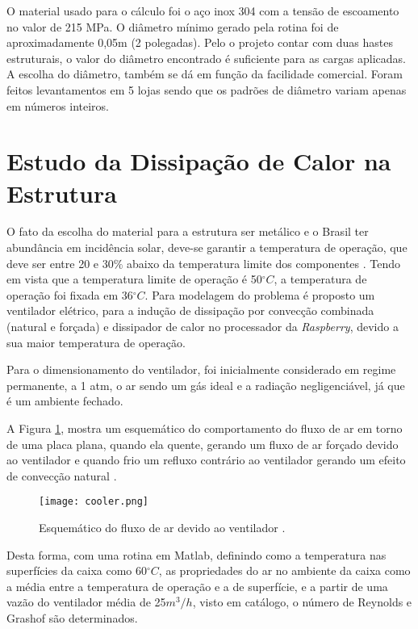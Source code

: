 O material usado para o cálculo foi o aço inox 304 com a tensão de escoamento no valor de 215 MPa. O diâmetro mínimo gerado pela rotina foi de aproximadamente 0,05m (2 polegadas). Pelo o projeto contar com duas hastes estruturais, o valor do diâmetro encontrado é suficiente para as cargas aplicadas. A escolha do diâmetro, também se dá em função da facilidade comercial. Foram feitos levantamentos em 5 lojas sendo que os padrões de diâmetro variam apenas em números inteiros.



\section{Estudo da Dissipação de Calor na Estrutura}

O fato da escolha do material para a estrutura ser metálico e o Brasil ter abundância em incidência solar, deve-se garantir a temperatura de operação, que deve ser entre 20 e $30\%$ abaixo da temperatura limite dos componentes \cite{temperatura}. Tendo em vista que a temperatura limite de operação é 50$^{\circ}C$, a temperatura de operação foi fixada em 36$^{\circ}C$. Para modelagem do problema é proposto um ventilador elétrico, para a indução de dissipação por convecção combinada (natural e forçada) e dissipador de calor no processador da \textit{Raspberry}, devido a sua maior temperatura de operação.

Para o dimensionamento do ventilador, foi inicialmente considerado em regime permanente, a 1 atm, o ar sendo um gás ideal e a radiação negligenciável, já que é um ambiente fechado.

A Figura \ref{cooler}, mostra um esquemático do comportamento do fluxo de ar em torno de uma placa plana, quando ela quente, gerando um fluxo de ar forçado devido ao ventilador e quando frio um refluxo contrário ao ventilador gerando um efeito de convecção natural \cite{livro_transcal}.

\begin{figure}[h]
	\centering
    \texttt{[image: cooler.png]}
    \caption{Esquemático do fluxo de ar devido ao ventilador \cite{livro_transcal}.}
    \label{cooler}
\end{figure}

Desta forma, com uma rotina em Matlab, definindo como a temperatura nas superfícies da caixa como 60$^{\circ}C$, as propriedades do ar no ambiente da caixa como a média entre a temperatura de operação e a de superfície, e a partir de uma vazão do ventilador média de 25$m^3/h$, visto em catálogo, o número de Reynolds e Grashof são determinados. 

